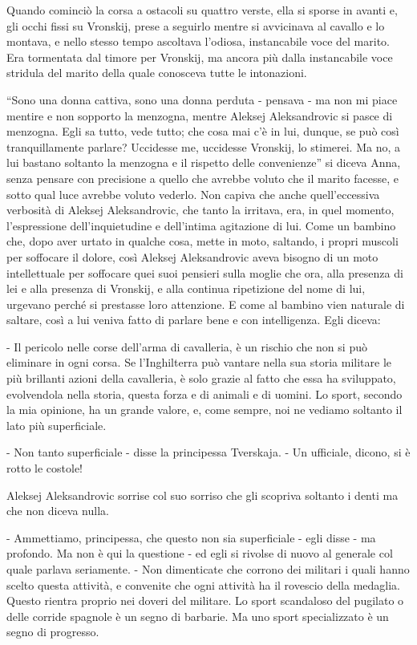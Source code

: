 Quando cominciò la corsa a ostacoli su quattro verste, ella si sporse in avanti e, gli occhi fissi su Vronskij, prese a seguirlo mentre si avvicinava al cavallo e lo montava, e nello stesso tempo ascoltava l'odiosa, instancabile voce del marito. Era tormentata dal timore per Vronskij, ma ancora più dalla instancabile voce stridula del marito della quale conosceva tutte le intonazioni. 

``Sono una donna cattiva, sono una donna perduta - pensava - ma non mi piace mentire e non sopporto la menzogna, mentre Aleksej Aleksandrovic si pasce di menzogna. Egli sa tutto, vede tutto; che cosa mai c'è in lui, dunque, se può così tranquillamente parlare? Uccidesse me, uccidesse Vronskij, lo stimerei. Ma no, a lui bastano soltanto la menzogna e il rispetto delle convenienze'' si diceva Anna, senza pensare con precisione a quello che avrebbe voluto che il marito facesse, e sotto qual luce avrebbe voluto vederlo. Non capiva che anche quell'eccessiva verbosità di Aleksej Aleksandrovic, che tanto la irritava, era, in quel momento, l'espressione dell'inquietudine e dell'intima agitazione di lui. Come un bambino che, dopo aver urtato in qualche cosa, mette in moto, saltando, i propri muscoli per soffocare il dolore, così Aleksej Aleksandrovic aveva bisogno di un moto intellettuale per soffocare quei suoi pensieri sulla moglie che ora, alla presenza di lei e alla presenza di Vronskij, e alla continua ripetizione del nome di lui, urgevano perché si prestasse loro attenzione. E come al bambino vien naturale di saltare, così a lui veniva fatto di parlare bene e con intelligenza. Egli diceva: 

- Il pericolo nelle corse dell'arma di cavalleria, è un rischio che non si può eliminare in ogni corsa. Se l'Inghilterra può vantare nella sua storia militare le più brillanti azioni della cavalleria, è solo grazie al fatto che essa ha sviluppato, evolvendola nella storia, questa forza e di animali e di uomini. Lo sport, secondo la mia opinione, ha un grande valore, e, come sempre, noi ne vediamo soltanto il lato più superficiale. 

- Non tanto superficiale - disse la principessa Tverskaja. - Un ufficiale, dicono, si è rotto le costole! 

Aleksej Aleksandrovic sorrise col suo sorriso che gli scopriva soltanto i denti ma che non diceva nulla. 

- Ammettiamo, principessa, che questo non sia superficiale - egli disse - ma profondo. Ma non è qui la questione - ed egli si rivolse di nuovo al generale col quale parlava seriamente. - Non dimenticate che corrono dei militari i quali hanno scelto questa attività, e convenite che ogni attività ha il rovescio della medaglia. Questo rientra proprio nei doveri del militare. Lo sport scandaloso del pugilato o delle corride spagnole è un segno di barbarie. Ma uno sport specializzato è un segno di progresso. 

